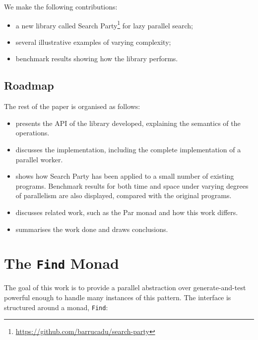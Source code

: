 We make the following contributions:

\begin{itemize}
  \item a new library called Search
    Party\footnote{\url{https://github.com/barrucadu/search-party}}
    for lazy parallel search;

  \item several illustrative examples of varying complexity;

  \item benchmark results showing how the library performs.
\end{itemize}

\subsection*{Roadmap}

The rest of the paper is organised as follows:

\begin{itemize}
  \item {} presents the API of the library developed, explaining
    the semantics of the operations.

  \item {} discusses the implementation, including the
    complete implementation of a parallel worker.

  \item {} shows how Search Party has been applied to a
    small number of existing programs. Benchmark results for both time and space
    under varying degrees of parallelism are also displayed, compared
    with the original programs.

  \item {} discusses related work, such as the Par
    monad\cite{par} and how this work differs.

  \item {} summarises the work done and draws conclusions.
\end{itemize}

\section{The \texttt{Find} Monad}
\label{sec:searchparty-api}

The goal of this work is to provide a parallel abstraction over
generate-and-test powerful enough to handle many instances of this
pattern. The interface is structured around a monad, \verb|Find|:

